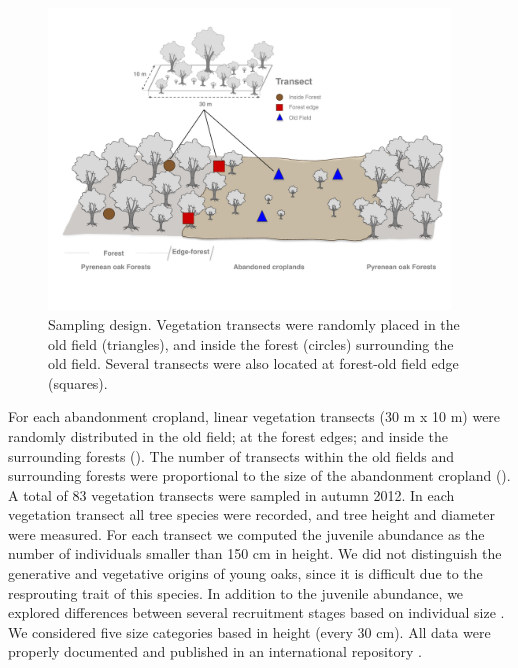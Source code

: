 \begin{figure}
    \centering
    \includegraphics[width=\textwidth,height=8cm,
  keepaspectratio]{img/coloniza/coloniza-transectScheme.pdf}
    \caption{Sampling design. Vegetation transects were randomly placed in the old field (triangles), and inside the forest (circles) surrounding the old field. Several transects were also located at forest-old field edge (squares).}
    \label{fig:coloniza:transects}
\end{figure}

For each abandonment cropland, linear vegetation transects (30 m x 10 m) were randomly distributed in the old field; at the forest edges; and inside the surrounding forests (). The number of transects within the old fields and surrounding forests were proportional to the size of the abandonment cropland (). A total of 83 vegetation transects were sampled in autumn 2012. In each vegetation transect all tree species were recorded, and tree height and diameter were measured. For each transect we computed the juvenile abundance as the number of individuals smaller than 150 cm in height. We did not distinguish the generative and vegetative origins of young oaks, since it is difficult due to the resprouting trait of this species. In addition to the juvenile abundance, we explored differences between several recruitment stages based on individual size \autocites[\emph{e.g}][]{Plieningeretal2010LargeScalePatterns}. We considered five size categories based in height (every 30 cm). All data were properly documented and published in an international repository \autocites[see][for a detailed description of the dataset]{PerezLuqueetal2015DatasetMIGRAME}. 

